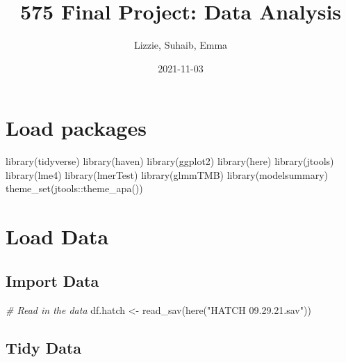 \documentclass[
]{article}
\title{575 Final Project: Data Analysis}
\author{Lizzie, Suhaib, Emma}
\date{2021-11-03}
\newenvironment{Shaded}{\begin{snugshade}}{\end{snugshade}}
\newcommand{\CommentTok}[1]{\textcolor[rgb]{0.56,0.35,0.01}{\textit{#1}}}
\newcommand{\FunctionTok}[1]{\textcolor[rgb]{0.00,0.00,0.00}{#1}}
\newcommand{\NormalTok}[1]{#1}
\newcommand{\OtherTok}[1]{\textcolor[rgb]{0.56,0.35,0.01}{#1}}
\newcommand{\SpecialCharTok}[1]{\textcolor[rgb]{0.00,0.00,0.00}{#1}}
\newcommand{\StringTok}[1]{\textcolor[rgb]{0.31,0.60,0.02}{#1}}
\begin{document}
\maketitle

{
\setcounter{tocdepth}{2}
\tableofcontents
}
\hypertarget{load-packages}{%
\section{Load packages}\label{load-packages}}

\begin{Shaded}
\begin{Highlighting}[]
\FunctionTok{library}\NormalTok{(tidyverse)}
\FunctionTok{library}\NormalTok{(haven)}
\FunctionTok{library}\NormalTok{(ggplot2)}
\FunctionTok{library}\NormalTok{(here)}
\FunctionTok{library}\NormalTok{(jtools)}
\FunctionTok{library}\NormalTok{(lme4)}
\FunctionTok{library}\NormalTok{(lmerTest)}
\FunctionTok{library}\NormalTok{(glmmTMB)}
\FunctionTok{library}\NormalTok{(modelsummary)}
\FunctionTok{theme\_set}\NormalTok{(jtools}\SpecialCharTok{::}\FunctionTok{theme\_apa}\NormalTok{())}
\end{Highlighting}
\end{Shaded}

\hypertarget{load-data}{%
\section{Load Data}\label{load-data}}

\hypertarget{import-data}{%
\subsection{Import Data}\label{import-data}}

\begin{Shaded}
\begin{Highlighting}[]
\CommentTok{\# Read in the data}
\NormalTok{df.hatch }\OtherTok{\textless{}{-}} \FunctionTok{read\_sav}\NormalTok{(}\FunctionTok{here}\NormalTok{(}\StringTok{"HATCH 09.29.21.sav"}\NormalTok{))}
\end{Highlighting}
\end{Shaded}

\hypertarget{tidy-data}{%
\subsection{Tidy Data}\label{tidy-data}}
\end{document}
